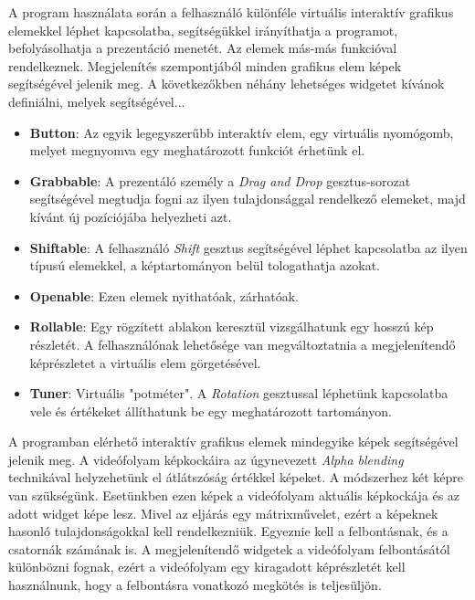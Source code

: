 

A program használata során a felhasználó különféle virtuális interaktív grafikus elemekkel léphet kapcsolatba, segítségükkel irányíthatja a programot, befolyásolhatja a prezentáció menetét. Az elemek más-más funkcióval rendelkeznek. Megjelenítés szempontjából minden grafikus elem képek segítségével jelenik meg. A következőkben néhány lehetséges widgetet kívánok definiálni, melyek segítségével...
\begin{itemize}
	\item \textbf{Button}: Az egyik legegyszerűbb interaktív elem, egy virtuális nyomógomb, melyet megnyomva egy meghatározott funkciót érhetünk el.
	\item \textbf{Grabbable}: A prezentáló személy a \textit{Drag and Drop} gesztus-sorozat segítségével megtudja fogni az ilyen tulajdonsággal rendelkező elemeket, majd kívánt új pozíciójába helyezheti azt.
	\item \textbf{Shiftable}: A felhasználó \textit{Shift} gesztus segítségével léphet kapcsolatba az ilyen típusú elemekkel, a képtartományon belül tologathatja azokat.
	\item \textbf{Openable}: Ezen elemek nyithatóak, zárhatóak.
	\item \textbf{Rollable}: Egy rögzített ablakon keresztül vizsgálhatunk egy hosszú kép részletét. A felhasználónak lehetősége van megváltoztatnia a megjelenítendő képrészletet a virtuális elem görgetésével.
	\item \textbf{Tuner}: Virtuális "potméter". A \textit{Rotation} gesztussal léphetünk kapcsolatba vele és értékeket állíthatunk be egy meghatározott tartományon.
\end{itemize}


A programban elérhető interaktív grafikus elemek mindegyike képek segítségével jelenik meg. A videófolyam képkockáira az úgynevezett \textit{Alpha blending} technikával helyzehetünk el átlátszóság értékkel képeket. A módszerhez két képre van szükségünk. Esetünkben ezen képek a videófolyam aktuális képkockája és az adott widget képe lesz. Mivel az eljárás egy mátrixművelet, ezért a képeknek hasonló tulajdonságokkal kell rendelkezniük. Egyeznie kell a felbontásnak, és a csatornák számának is. A megjelenítendő widgetek a videófolyam felbontásától különbözni fognak, ezért a videófolyam egy kiragadott képrészletét kell használnunk, hogy a felbontásra vonatkozó megkötés is teljesüljön.

